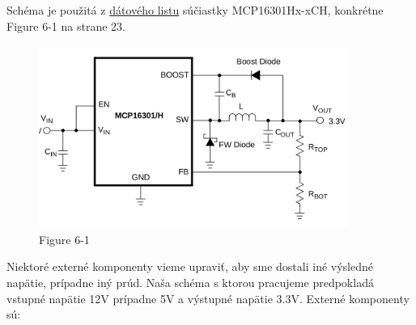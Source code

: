 Schéma je použitá z \href{https://github.com/ostertag/UACS/blob/hardwear_kozuch/power_suply_shc_1/Data_sheet.pdf}{dátového listu} súčiastky
MCP16301Hx-xCH, konkrétne Figure 6-1 na strane 23.
\begin{figure}[h!]
    \centerline{\includegraphics[width=0.9\textwidth]{sch_original.png}}
    \caption{Figure 6-1 }
    \label{obr:shc2}
\end{figure}
Niektoré externé komponenty vieme upraviť, aby sme dostali iné výsledné
napätie, prípadne iný prúd.
Naša schéma s ktorou pracujeme predpokladá vstupné napätie 12V prípadne
5V a výstupné napätie 3.3V.
Externé komponenty sú: 
